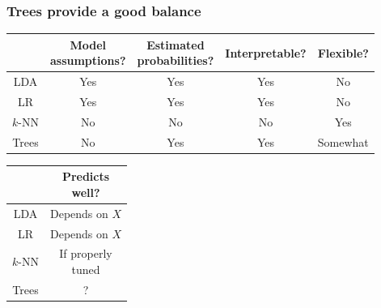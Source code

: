 \documentclass[mathserif]{beamer}
\def\red{\color[rgb]{0.8,0,0}}
\begin{document}
\begin{frame}
\frametitle{Trees provide a good balance}
\begin{center}
\begin{tabular}{|c|c|c|c|c|}
\hline
& \parbox{0.8in}{\centering Model \\ assumptions?} &
\parbox{0.8in}{\centering Estimated \\ probabilities?} &
Interpretable? & Flexible? \\
\hline
LDA & Yes & Yes & Yes & No \\
\hline
LR & Yes & Yes & Yes & No \\
\hline
$k$-NN & No & No & No & Yes \\
\hline
Trees & No & Yes & Yes & Somewhat \\
\hline
\end{tabular}

\bigskip
\bigskip
\begin{tabular}{|c|c|}
\hline
& \parbox{1in}{\centering Predicts \\ well?} \\
\hline
LDA & Depends on $X$ \\
\hline
LR & Depends on $X$ \\
\hline
$k$-NN & \parbox{1in}{\centering If properly \\ tuned} \\
\hline
Trees & ? \\
\hline
\end{tabular}
\end{center}



\end{frame}
\end{document}
